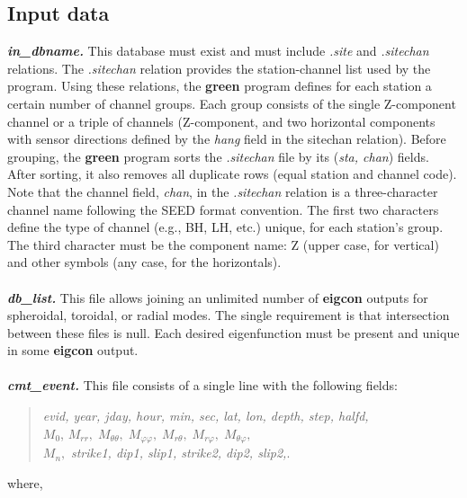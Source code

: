 \subsection {Input data}

\textbf{\large \emph{in\_dbname.}} 
  This database must exist and must include
  {\it .site} and {\it .sitechan} relations. 
  The {\it .sitechan} relation provides the station-channel list used
by the program. Using these relations, the
  {\bf green} program defines for each station 
  a certain number of channel groups. Each group consists of the single 
  Z-component channel or a triple of channels (Z-component, and two horizontal 
  components with sensor directions defined by the {\it hang} field in the
sitechan relation).
  Before grouping, the {\bf green} program sorts the {\it .sitechan} file
by its ({\it sta, chan}) fields. After sorting, it also removes all duplicate 
  rows (equal station and channel code). Note that the channel field,
  {\it chan}, in the {\it .sitechan} relation is a
  three-character channel name following the SEED format convention. 
  The first two characters define the type of channel (e.g., BH, LH, etc.)
unique, for each
  station's group.
  The third character must be the component name: Z (upper case, for vertical) 
  and other symbols (any case, for the horizontals). \\
\\
\textbf{\large \emph{db\_list.}} This file allows 
  joining an unlimited number of {\bf eigcon} outputs for spheroidal, toroidal, or
  radial modes. The single requirement is that intersection between these
files is null. Each desired eigenfunction must be present and unique in
  some {\bf eigcon} output. \\
\\
\textbf{\large \emph{cmt\_event.}} This file consists of a single line with the 
  following fields:  \\
\begin{quote}
{\it evid, year, jday, hour, min, sec, lat, lon,
  depth, step, halfd, }\\
  $M_0$, $M_{rr},\;M_{\theta \theta},\;M_{\varphi\varphi},\;
  M_{r \theta},\; M_{r \varphi},\; M_{\theta\varphi},$ \\
  $M_{n},$ {\it strike1, dip1, slip1, strike2, dip2, slip2,}.
\end{quote}
where, 
